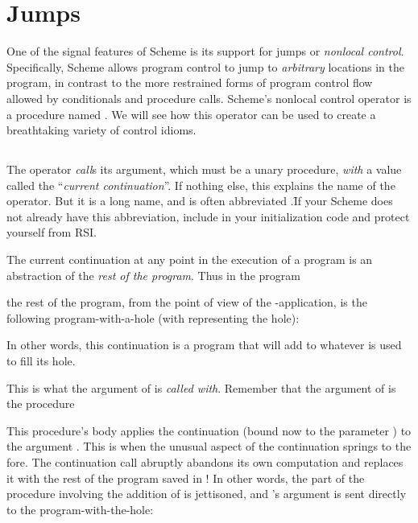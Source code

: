 \chapter{Jumps}

One of the signal features of Scheme is its support for
jumps or {\em nonlocal control}.  Specifically, Scheme
allows program control to jump to {\em arbitrary}
locations in the program, in contrast to the more
restrained forms of program control flow allowed by
conditionals and procedure calls.  Scheme's nonlocal
control operator is a procedure named
.   We will
see how this operator can be used to create a
breathtaking variety of control idioms.

\section{}

The operator  {\em
call}s its argument, which must be a unary procedure,
{\em with} a value called the ``{\em current
continuation}''.  If nothing else, this explains the
name of the operator.  But it is a long name, and is
often abbreviated
.\f{If your Scheme does not already have this
abbreviation, include
 in
your initialization code and protect yourself from
RSI.}

The current continuation at any point in the execution
of a program is an abstraction of the {\em rest of the
program}.  Thus in the program


\n
the rest of the program, from the point of view of the
-application, is the following
program-with-a-hole (with \q{[]} representing the
hole):


\n
In other words, this continuation is a program that
will add  to whatever is used to fill its hole.

This is what the argument of  is {\em called
with}.  Remember that the argument of  is
the procedure


\n
This procedure's body applies the continuation (bound
now to the parameter ) to the argument .
This is when the unusual aspect of the continuation
springs to the fore.  The continuation call abruptly
abandons its own computation and replaces it with the
rest of the program saved in !  In other words,
the part of the procedure involving the addition of
 is jettisoned, and 's argument  is sent
directly to the program-with-the-hole:

